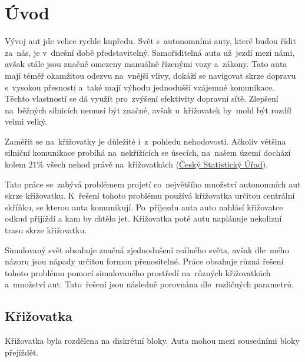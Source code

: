 \chapter*{Úvod}

Vývoj aut jde velice rychle kupředu.
Svět s~autonomními auty, které budou řídit za~nás, je v~dnešní době představitelný.
Samořiditelná auta už~jezdí mezi námi, avšak stále jsou značně omezeny manuálně řízenými vozy a~zákony.
Tato auta mají téměř okamžitou odezvu na~vnější vlivy, dokáží se navigovat skrze dopravu s~vysokou přesností a~také mají výhodu jednodušší vzájemné komunikace.
Těchto vlastností se dá využít pro~zvýšení efektivity dopravní sítě.
Zlepšení na~běžných silnicích nemusí být značné, avšak u~křižovatek by~mohl být rozdíl velmi velký.

Zaměřit se na~křižovatky je důležité i~z~pohledu nehodovosti.
Ačkoliv většina silniční komunikace probíhá na~nekřížících se úsecích, na~našem území dochází kolem $21\%$ všech nehod
právě na~křižovatkách (\href{https://www.czso.cz/documents/10180/20534694/32025414a06.pdf}{Český Statistický Úřad}).

Tato práce se~zabývá problémem projetí co~největšího množství autonomních aut skrze křižovatku.
K~řešení tohoto problému používá křižovatka určitou centrální skříňku, se kterou auta komunikují.
Po~příjezdu auta auto nahlásí křižovatce odkud přijíždí a kam by chtělo jet.
Křižovatka poté autu naplánuje nekolizní trasu skrze křižovatku.

Simulovaný svět obsahuje značná zjednodušení reálného světa, avšak dle~mého názoru jsou nápady určitou formou přenositelné.
Práce obsahuje různá řešení tohoto problému pomocí simulovaného prostředí na~různých křižovatkách a~množství aut.
Tato~řešení jsou následně porovnána dle~rozličných parametrů.

\section{Křižovatka}

Křižovatka byla rozdělena na diskrétní bloky.
Auta mohou mezi sousedními bloky přejíždět.
